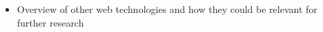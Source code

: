 \begin{itemize}
\item Overview of other web technologies and how they could be relevant for further research
\end{itemize}



